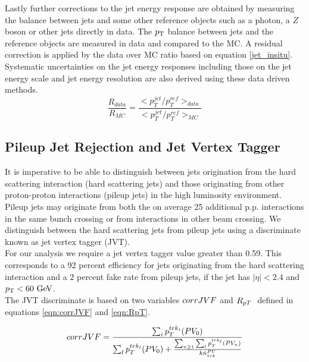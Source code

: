 \indent Lastly further corrections to the jet energy response are obtained by measuring the balance between jets and some other reference objects such as a photon, a $Z$ boson or other jets directly in data. \cite{JES_ZGamma,JES_dijet}  The $p_{\mathrm{T}}$ balance between jets and the reference objects are measured in data and compared to the MC.  A residual correction is applied by the data over MC ratio based on equation \ref{jet_insitu}.  Systematic uncertainties on the jet energy responses including those on the jet energy scale and jet energy resolution are also derived using these data driven methods. \\

\begin{equation}
\frac{R_{data}}{R_{MC}} = \frac{<p_T^{jet}/p_T^{ref}>_{data}}{<p_T^{jet}/p_T^{ref}>_{MC}}
\label{eqn:jet_insitu}
\end{equation}


\subsection{Pileup Jet Rejection and Jet Vertex Tagger}
\label{sec:jet:JVT}

\indent It is imperative to be able to distinguish between jets origination from the hard scattering interaction (hard scattering jets) and those originating from other proton-proton interactions (pileup jets) in the high luminosity environment.  Pileup jets may originate from both the on average 25 additional p.p. interactions in the same bunch crossing or from interactions in other beam crossing.  We distinguish between the hard scattering jets from pileup jets using a discriminate known as jet vertex tagger (JVT).\cite{JVT} \\

\indent For our analysis we require a jet vertex tagger value greater than 0.59.  This corresponds to a 92 percent efficiency for jets originating from the hard scattering interaction and a 2 percent fake rate from pileup jets, if the jet has $|\eta| < 2.4$ and $\pt < 60 \gev$.\\

\indent The JVT discriminate is based on two variables $corrJVF$ and $R_{pT}\ $ defined in equations \ref{eqn:corrJVF} and \ref{eqn:RpT}.

\begin{equation}
corrJVF = \frac{\sum_i p_T^{trk_i} (PV_0) }{ \sum_l p_T^{trk_l} (PV_0) + \frac{\sum_{n\ge1} \sum_l p_T^{trk_l} (PV_n) }{k\dot n^{PU}_{trk}} }
\label{eqn:JVF}
\end{equation}

